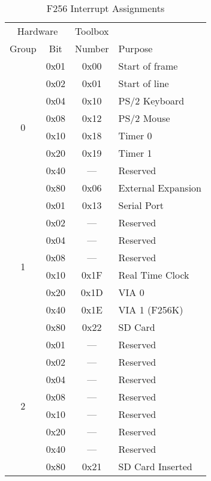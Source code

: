 \begin{table}
    \begin{center}
        \begin{tabular}{|c|c||c|l|} \hline 
            \multicolumn{2}{|c||}{Hardware} & Toolbox & \\
            Group & Bit & Number & Purpose \\ \hline
            \multirow{8}{*}{0} & 0x01 & 0x00 & Start of frame \\ \cline{2-4}
                & 0x02 & 0x01 & Start of line \\ \cline{2-4}
                & 0x04 & 0x10 & PS/2 Keyboard \\ \cline{2-4}
                & 0x08 & 0x12 & PS/2 Mouse \\ \cline{2-4}
                & 0x10 & 0x18 & Timer 0 \\ \cline{2-4}
                & 0x20 & 0x19 & Timer 1 \\ \cline{2-4}
                & 0x40 & ---  & Reserved \\ \cline{2-4}
                & 0x80 & 0x06 & External Expansion \\ \hline\hline

            \multirow{8}{*}{1} & 0x01 & 0x13 & Serial Port \\ \cline{2-4}
                & 0x02 & ---  & Reserved \\ \cline{2-4}
                & 0x04 & ---  & Reserved \\ \cline{2-4}
                & 0x08 & ---  & Reserved \\ \cline{2-4}
                & 0x10 & 0x1F & Real Time Clock \\ \cline{2-4}
                & 0x20 & 0x1D & VIA 0 \\ \cline{2-4}
                & 0x40 & 0x1E & VIA 1 (F256K) \\ \cline{2-4}
                & 0x80 & 0x22 & SD Card \\ \hline\hline

            \multirow{8}{*}{2} & 0x01 & --- & Reserved \\ \cline{2-4}
                & 0x02 & --- & Reserved \\ \cline{2-4}
                & 0x04 & --- & Reserved \\ \cline{2-4}
                & 0x08 & --- & Reserved \\ \cline{2-4}
                & 0x10 & --- & Reserved \\ \cline{2-4}
                & 0x20 & --- & Reserved \\ \cline{2-4}
                & 0x40 & --- & Reserved \\ \cline{2-4}
                & 0x80 & 0x21 & SD Card Inserted \\ \hline
        \end{tabular}
    \end{center}
    \caption{F256 Interrupt Assignments}
\end{table}

